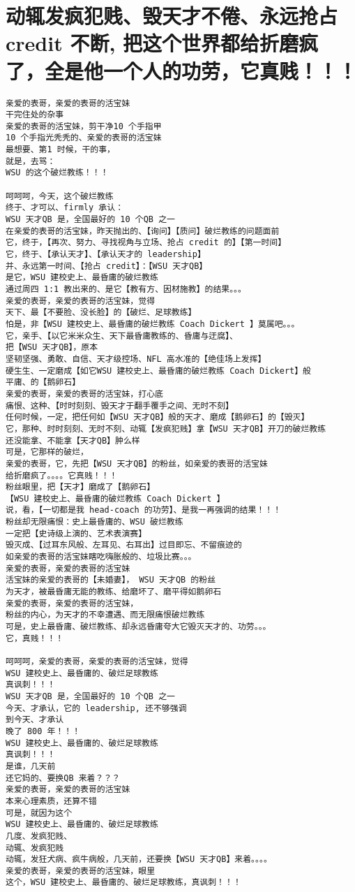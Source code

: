 \documentclass[9pt, b5paper]{article}
\begin{document}
\section{动辄发疯犯贱、毁天才不倦、永远抢占 credit 不断, 把这个世界都给折磨疯了，全是他一个人的功劳，它真贱！！！}
\label{sec-8}
\begin{verbatim}
亲爱的表哥，亲爱的表哥的活宝妹
干完住处的杂事
亲爱的表哥的活宝妹，剪干净10 个手指甲
10 个手指光秃秃的、亲爱的表哥的活宝妹
最想要、第1 时候，干的事，
就是，去骂：
WSU 的这个破烂教练！！！

呵呵呵，今天，这个破烂教练
终于、才可以、firmly 承认：
WSU 天才QB 是，全国最好的 10 个QB 之一
在亲爱的表哥的活宝妹，昨天抛出的、【询问】【质问】破烂教练的问题面前
它，终于，【再次、努力、寻找视角与立场、抢占 credit 的】【第一时间】
它，终于、【承认天才】、【承认天才的 leadership】
并、永远第一时间、【抢占 credit】：【WSU 天才QB】
是它，WSU 建校史上、最昏庸的破烂教练
通过周四 1:1 教出来的、是它【教有方、因材施教】的结果。。。
亲爱的表哥，亲爱的表哥的活宝妹，觉得
天下、最【不要脸、没长脸】的【破烂、足球教练】
怕是，非【WSU 建校史上、最昏庸的破烂教练 Coach Dickert 】莫属吧。。。
它，亲手、【以它米米众生、天下最昏庸教练的、昏庸与迂腐】、
把【WSU 天才QB】，原本 
坚韧坚强、勇敢、自信、天才级控场、NFL 高水准的【绝佳场上发挥】
硬生生、一定磨成【如它WSU 建校史上、最昏庸的破烂教练 Coach Dickert】般
平庸、的【鹅卵石】
亲爱的表哥，亲爱的表哥的活宝妹，打心底
痛恨、这种、【时时刻刻、毁天才于翻手覆手之间、无时不刻】
任何时候，一定，把任何如【WSU 天才QB】般的天才、磨成【鹅卵石】的【毁灭】
它，那种、时时刻刻、无时不刻、动辄【发疯犯贱】拿【WSU 天才QB】开刀的破烂教练
还没能拿、不能拿【天才QB】肿么样
可是，它那样的破烂，
亲爱的表哥，它，先把【WSU 天才QB】的粉丝，如亲爱的表哥的活宝妹
给折磨疯了。。。。它真贱！！！
粉丝眼里，把【天才】磨成了【鹅卵石】
【WSU 建校史上、最昏庸的破烂教练 Coach Dickert 】
说，看，【一切都是我 head-coach 的功劳】、是我一再强调的结果！！！
粉丝却无限痛恨：史上最昏庸的、WSU 破烂教练
一定把【史诗级上演的、艺术表演赛】
毁灭成、【过耳东风般、左耳见、右耳出】过目即忘、不留痕迹的
如亲爱的表哥的活宝妹瞎吃嗨胀般的、垃圾比赛。。。
亲爱的表哥，亲爱的表哥的活宝妹
活宝妹的亲爱的表哥的【未婚妻】， WSU 天才QB 的粉丝
为天才，被最昏庸无能的教练、给磨坏了、磨平得如鹅卵石
亲爱的表哥，亲爱的表哥的活宝妹，
粉丝的内心，为天才的不幸遭遇、而无限痛恨破烂教练
可是，史上最昏庸、破烂教练、却永远昏庸夸大它毁灭天才的、功劳。。。
它，真贱！！！

呵呵呵，亲爱的表哥，亲爱的表哥的活宝妹，觉得
WSU 建校史上、最昏庸的、破烂足球教练
真讽刺！！！
WSU 天才QB 是，全国最好的 10 个QB 之一
今天、才承认，它的 leadership, 还不够强调
到今天、才承认
晚了 800 年！！！
WSU 建校史上、最昏庸的、破烂足球教练
真讽刺！！！
是谁，几天前
还它妈的、要换QB 来着？？？
亲爱的表哥，亲爱的表哥的活宝妹
本来心理素质，还算不错
可是，就因为这个
WSU 建校史上、最昏庸的、破烂足球教练
几度、发疯犯贱、
动辄、发疯犯贱
动辄，发狂犬病、疯牛病般，几天前，还要换【WSU 天才QB】来着。。。。
亲爱的表哥，亲爱的表哥的活宝妹，眼里
这个，WSU 建校史上、最昏庸的、破烂足球教练，真讽刺！！！


\end{verbatim}
\end{document}
